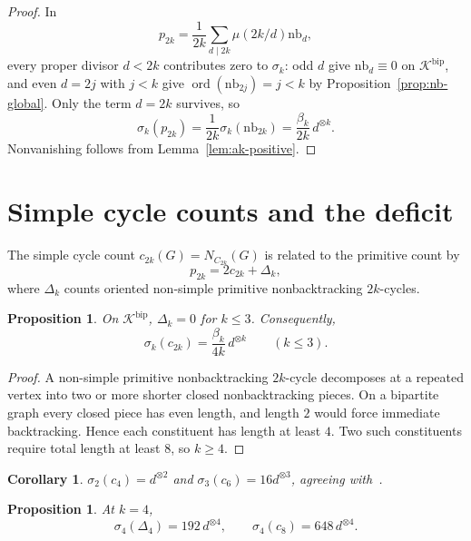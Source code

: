 \documentclass[11pt]{amsart}
\newcommand{\K}{\mathcal{K}}
\newcommand{\ord}{\operatorname{ord}}
\newcommand{\nb}{\mathrm{nb}}
\newtheorem{proposition}[theorem]{Proposition}
\newtheorem{corollary}[theorem]{Corollary}
\theoremstyle{definition}
\theoremstyle{remark}
\begin{document}
\begin{proof}
In
\[
   p_{2k}=\frac{1}{2k}\sum_{d\mid2k}\mu(2k/d)\nb_d,
\]
every proper divisor $d<2k$ contributes zero to $\sigma_k$: odd $d$ give $\nb_d\equiv0$ on $\K^{\mathrm{bip}}$, and even $d=2j$ with $j<k$ give $\ord(\nb_{2j})=j<k$ by Proposition~\ref{prop:nb-global}. Only the term $d=2k$ survives, so
\[
   \sigma_k(p_{2k})=\frac{1}{2k}\sigma_k(\nb_{2k})=\frac{\beta_k}{2k}\,d^{\otimes k}.
\]
Nonvanishing follows from Lemma~\ref{lem:ak-positive}.
\end{proof}

\section{Simple cycle counts and the deficit}

The simple cycle count $c_{2k}(G)=N_{C_{2k}}(G)$ is related to the primitive count by
\[
   p_{2k}=2c_{2k}+\Delta_k,
\]
where $\Delta_k$ counts oriented non-simple primitive nonbacktracking $2k$-cycles.

\begin{proposition}\label{prop:deficit-vanishes}
On $\K^{\mathrm{bip}}$, $\Delta_k=0$ for $k\le3$. Consequently,
\[
   \sigma_k(c_{2k})=\frac{\beta_k}{4k}\,d^{\otimes k}
   \qquad(k\le3).
\]
\end{proposition}

\begin{proof}
A non-simple primitive nonbacktracking $2k$-cycle decomposes at a repeated vertex into two or more shorter closed nonbacktracking pieces. On a bipartite graph every closed piece has even length, and length $2$ would force immediate backtracking. Hence each constituent has length at least $4$. Two such constituents require total length at least $8$, so $k\ge4$.
\end{proof}

\begin{corollary}\label{cor:low-cycles}
$\sigma_2(c_4)=d^{\otimes2}$ and $\sigma_3(c_6)=16d^{\otimes3}$, agreeing with~\cite{RG}.
\end{corollary}

\begin{proposition}\label{prop:k4-junction}
At $k=4$,
\[
   \sigma_4(\Delta_4)=192\,d^{\otimes4},\qquad
   \sigma_4(c_8)=648\,d^{\otimes4}.
\]
\end{proposition}
\end{document}
